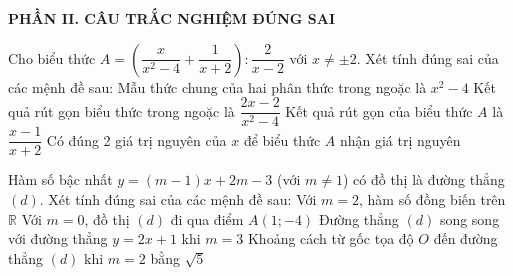 \documentclass[12pt,a4paper]{article}
\begin{document}
\setcounter{ex}{0}
\noindent\textbf{\large PHẦN II. CÂU TRẮC NGHIỆM ĐÚNG SAI}
\vspace{1mm}
\begin{ex}
Cho biểu thức $A = \left(\dfrac{x}{x^2 - 4} + \dfrac{1}{x + 2}\right) : \dfrac{2}{x - 2}$ với $x \neq \pm 2$. Xét tính đúng sai của các mệnh đề sau:
\choiceTF
{\True Mẫu thức chung của hai phân thức trong ngoặc là $x^2 - 4$}
{\True Kết quả rút gọn biểu thức trong ngoặc là $\dfrac{2x - 2}{x^2 - 4}$}
{\True Kết quả rút gọn của biểu thức $A$ là $\dfrac{x - 1}{x + 2}$}
{Có đúng 2 giá trị nguyên của $x$ để biểu thức $A$ nhận giá trị nguyên}
\end{ex}

\begin{ex}
Hàm số bậc nhất $y = (m - 1)x + 2m - 3$ (với $m \neq 1$) có đồ thị là đường thẳng $(d)$. Xét tính đúng sai của các mệnh đề sau:
\choiceTF
{\True Với $m = 2$, hàm số đồng biến trên $\mathbb{R}$}
{\True Với $m = 0$, đồ thị $(d)$ đi qua điểm $A(1; -4)$}
{\True Đường thẳng $(d)$ song song với đường thẳng $y = 2x + 1$ khi $m = 3$}
{Khoảng cách từ gốc tọa độ $O$ đến đường thẳng $(d)$ khi $m = 2$ bằng $\sqrt{5}$}
\end{ex}
\end{document}
